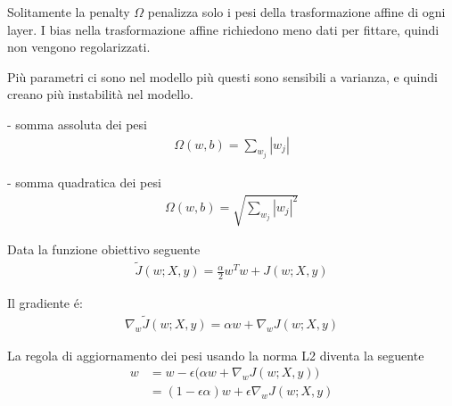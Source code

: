 Solitamente la penalty $\Omega$ penalizza solo i pesi della trasformazione affine di ogni layer. 
I bias nella trasformazione affine richiedono meno dati per fittare, quindi non vengono regolarizzati.

Più parametri ci sono nel modello più questi sono sensibili a varianza, e quindi creano più instabilità nel modello.

- somma assoluta dei pesi
\begin{align*}
  \Omega(w, b) = \sum_{w_j}|w_j|
\end{align*}

- somma quadratica dei pesi
\begin{align*}
  \Omega(w, b) = \sqrt{\sum_{w_j}|w_j|^2}
\end{align*}

Data la funzione obiettivo seguente
\begin{align*}
  \tilde{J}(w; X, y) = \frac{\alpha}{2} w^T w + J(w; X, y)
\end{align*}

Il gradiente é:
\begin{align*}
  \nabla_w \tilde{J}(w; X, y) = \alpha w + \nabla_w J(w; X, y)
\end{align*}

La regola di aggiornamento dei pesi usando la norma L2 diventa la seguente
\begin{align*}
  w &= w - \epsilon \big( \alpha w + \nabla_w J(w; X, y) \big)\\
    &= (1 - \epsilon \alpha) w + \epsilon \nabla_w J(w; X, y)
\end{align*}
